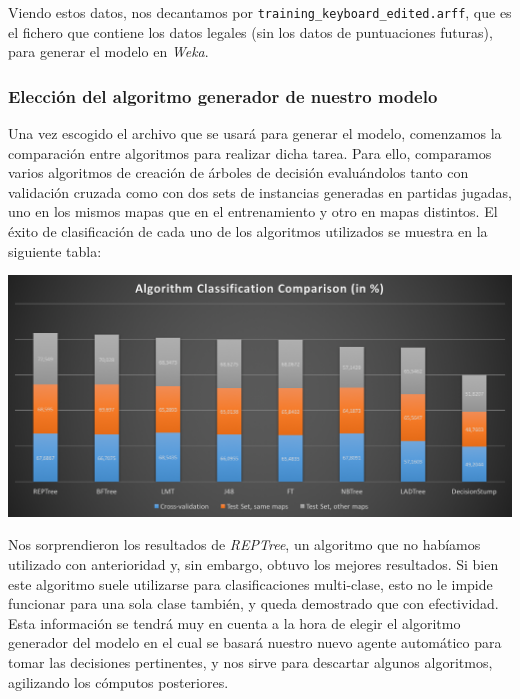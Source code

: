 \documentclass[12pt]{article}
\begin{document}
Viendo estos datos, nos decantamos por \texttt{training\_keyboard\_edited.arff}, que es el fichero que contiene los datos legales (sin los datos de puntuaciones futuras), para generar el modelo en \emph{Weka}.

\newpage
\subsubsection{Elección del algoritmo generador de nuestro modelo}

Una vez escogido el archivo que se usará para generar el modelo, comenzamos la comparación entre algoritmos para realizar dicha tarea. Para ello, comparamos varios algoritmos de creación de árboles de decisión evaluándolos tanto con validación cruzada como con dos sets de instancias generadas en partidas jugadas, uno en los mismos mapas que en el entrenamiento y otro en mapas distintos. El éxito de clasificación de cada uno de los algoritmos utilizados se muestra en la siguiente tabla:

\vspace{0.2cm}

\noindent \includegraphics[width=\textwidth]{algorithm_comparison}

\vspace{0.2cm}

Nos sorprendieron los resultados de \emph{REPTree}, un algoritmo que no habíamos utilizado con anterioridad y, sin embargo, obtuvo los mejores resultados. Si bien este algoritmo suele utilizarse para clasificaciones multi-clase, esto no le impide funcionar para una sola clase también, y queda demostrado que con efectividad. Esta información se tendrá muy en cuenta a la hora de elegir el algoritmo generador del modelo en el cual se basará nuestro nuevo agente automático para tomar las decisiones pertinentes, y nos sirve para descartar algunos algoritmos, agilizando los cómputos posteriores.
\end{document}

